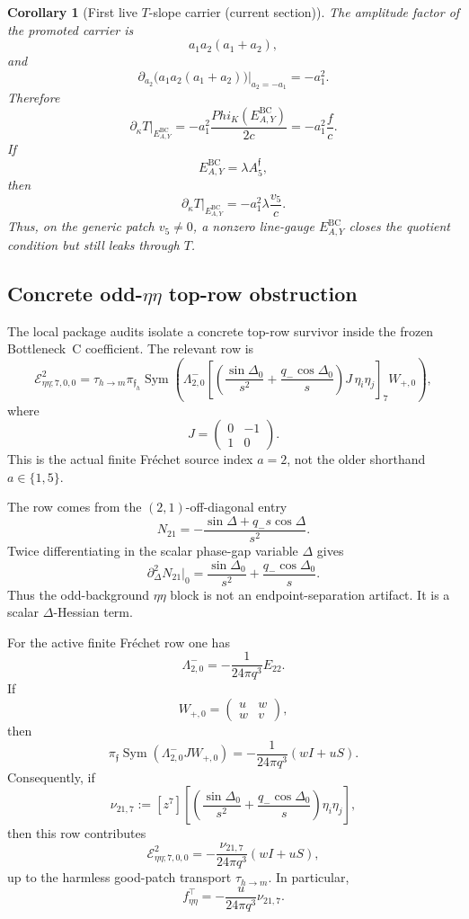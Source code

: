 \documentclass[11pt,a4paper]{amsart}
\def\Phi{Phi}%
\theoremstyle{plain}
\newtheorem{corollary}[theorem]{Corollary}
\theoremstyle{definition}
\begin{document}
\begin{corollary}[First live \(T\)-slope carrier (current section)]
\label{cor:first-live-t-slope-carrier-current}
The amplitude factor of the promoted carrier is
\[
a_1a_2(a_1+a_2),
\]
and
\[
\partial_{a_2}\bigl(a_1a_2(a_1+a_2)\bigr)\big|_{a_2=-a_1}
=
-a_1^2.
\]
Therefore
\[
\partial_\kappa T\big|_{E_{A,Y}^{\mathrm{BC}}}
=
-a_1^2\frac{\Phi_K(E_{A,Y}^{\mathrm{BC}})}{2c}
=
-a_1^2\frac{f}{c}.
\]
If
\[
E_{A,Y}^{\mathrm{BC}}=\lambda A_5^{\mathfrak f},
\]
then
\[
\partial_\kappa T\big|_{E_{A,Y}^{\mathrm{BC}}}
=
-a_1^2\lambda\frac{v_5}{c}.
\]
Thus, on the generic patch \(v_5\ne0\), a nonzero line-gauge
\(E_{A,Y}^{\mathrm{BC}}\) closes the quotient condition but still leaks
through \(T\).
\end{corollary}

\subsection{Concrete odd-\(\eta\eta\) top-row obstruction}
\label{subsec:concrete-odd-etaeta-top-row-obstruction}

The local package audits isolate a concrete top-row survivor inside the frozen
Bottleneck~C coefficient.  The relevant row is
\[
\mathcal E^{2}_{\eta\eta;7,0,0}
=
\tau_{h\to m}\pi_{\mathfrak f_h}
\operatorname{Sym}
\left(
\Lambda^-_{2,0}
\left[
\left(
\frac{\sin\Delta_0}{s^2}
+
\frac{q_-\cos\Delta_0}{s}
\right)
J\,\eta_i\eta_j
\right]_{7}
W_{+,0}
\right),
\]
where
\[
J=
\begin{pmatrix}
0&-1\\
1&0
\end{pmatrix}.
\]
This is the actual finite Fr\'echet source index \(a=2\), not the older
shorthand \(a\in\{1,5\}\).

The row comes from the \((2,1)\)-off-diagonal entry
\[
N_{21}
=
-\frac{\sin\Delta+q_-s\cos\Delta}{s^2}.
\]
Twice differentiating in the scalar phase-gap variable \(\Delta\) gives
\[
\partial_\Delta^2N_{21}\big|_0
=
\frac{\sin\Delta_0}{s^2}
+
\frac{q_-\cos\Delta_0}{s}.
\]
Thus the odd-background \(\eta\eta\) block is not an endpoint-separation
artifact.  It is a scalar \(\Delta\)-Hessian term.

For the active finite Fr\'echet row one has
\[
\Lambda^-_{2,0}
=
-\frac{1}{24\pi q^3}E_{22}.
\]
If
\[
W_{+,0}
=
\begin{pmatrix}
u&w\\
w&v
\end{pmatrix},
\]
then
\[
\pi_{\mathfrak f}\operatorname{Sym}
\left(
\Lambda^-_{2,0}JW_{+,0}
\right)
=
-\frac{1}{24\pi q^3}(wI+uS).
\]
Consequently, if
\[
\nu_{21,7}
:=
[z^7]\left[
\left(
\frac{\sin\Delta_0}{s^2}
+
\frac{q_-\cos\Delta_0}{s}
\right)\eta_i\eta_j
\right],
\]
then this row contributes
\[
\mathcal E^{2}_{\eta\eta;7,0,0}
=
-\frac{\nu_{21,7}}{24\pi q^3}(wI+uS),
\]
up to the harmless good-patch transport \(\tau_{h\to m}\).  In particular,
\[
f_{\eta\eta}^{\top}
=
-\frac{u}{24\pi q^3}\nu_{21,7}.
\]
\end{document}
